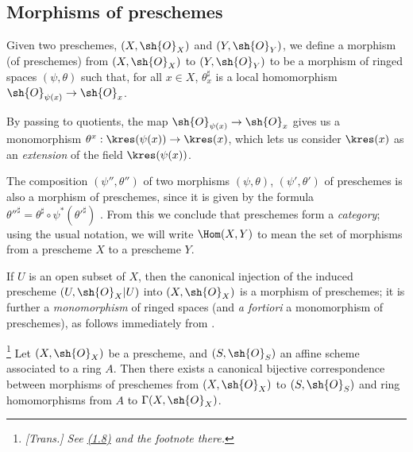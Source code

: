 \subsection{Morphisms of preschemes}
\label{subsection:I.2.2}
\label{I.2.2}

\begin{definition}[2.2.1]
\label{I.2.2.1}
Given two preschemes, $(X,\sh{O}_X)$ and $(Y,\sh{O}_Y)$, we define a morphism (of preschemes) from $(X,\sh{O}_X)$ to $(Y,\sh{O}_Y)$ to be a morphism of ringed spaces $(\psi,\theta)$ such that, for all $x\in X$, $\theta_x^\sharp$ is a local homomorphism $\sh{O}_{\psi(x)}\to\sh{O}_x$.
\end{definition}

By passing to quotients, the map $\sh{O}_{\psi(x)}\to\sh{O}_x$ gives us a monomorphism $\theta^x:\kres(\psi(x))\to\kres(x)$, which lets us consider $\kres(x)$ as an \emph{extension} of the field $\kres(\psi(x))$.

\begin{env}[2.2.2]
\label{I.2.2.2}
The composition $(\psi'',\theta'')$ of two morphisms $(\psi,\theta)$, $(\psi',\theta')$ of preschemes is also a morphism of preschemes, since it is given by the formula ${\theta''}^\sharp=\theta^\sharp\circ\psi^*({\theta'}^\sharp)$ .
From this we conclude that preschemes form a \emph{category};
using the usual notation, we will write $\Hom(X,Y)$ to mean the set of morphisms from a prescheme $X$ to a prescheme $Y$.
\end{env}

\begin{example}[2.2.3]
\label{I.2.2.3}
If $U$ is an open subset of $X$, then the canonical injection  of the induced prescheme $(U,\sh{O}_X|U)$ into $(X,\sh{O}_X)$ is a morphism of preschemes;
it is further a \emph{monomorphism} of ringed spaces (and \emph{a fortiori} a monomorphism of preschemes), as follows immediately from .
\end{example}

\begin{proposition}[2.2.4]
\label{I.2.2.4}
\footnote{\emph{[Trans.] See \hyperref[subsection:I.1.8]{(1.8)} and the footnote there.}}
Let $(X,\sh{O}_X)$ be a prescheme, and $(S,\sh{O}_S)$ an affine scheme associated to a ring $A$.
Then there exists a canonical bijective correspondence between morphisms of preschemes from $(X,\sh{O}_X)$ to $(S,\sh{O}_S)$ and ring homomorphisms from $A$ to $\Gamma(X,\sh{O}_X)$.
\end{proposition}

